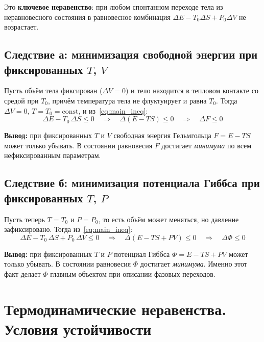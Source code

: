 \documentclass[../general/general]{subfiles}
\begin{document}
Это \textbf{ключевое неравенство}: при любом спонтанном переходе тела из неравновесного состояния в равновесное комбинация $\Delta E - T_0\Delta S + P_0\Delta V$ не возрастает.

\subsection{Следствие а: минимизация свободной энергии при фиксированных $T$, $V$}

Пусть объём тела фиксирован ($\Delta V = 0$) и тело находится в тепловом контакте со средой при $T_0$, причём температура тела не флуктуирует и равна $T_0$. Тогда $\Delta V = 0$, $T = T_0 = \text{const}$, и из~\eqref{eq:main_ineq}:
\begin{equation}
    \Delta E - T_0\,\Delta S \leq 0 \quad \Rightarrow \quad \Delta(E - TS) \leq 0 \quad \Rightarrow \quad \Delta F \leq 0
\end{equation}

\textbf{Вывод:} при фиксированных $T$ и $V$ свободная энергия Гельмгольца $F = E - TS$ может только убывать. В состоянии равновесия $F$ достигает \emph{минимума} по всем нефиксированным параметрам.

\subsection{Следствие б: минимизация потенциала Гиббса при фиксированных $T$, $P$}

Пусть теперь $T = T_0$ и $P = P_0$, то есть объём может меняться, но давление зафиксировано. Тогда из~\eqref{eq:main_ineq}:
\begin{equation}
    \Delta E - T_0\,\Delta S + P_0\,\Delta V \leq 0 \quad \Rightarrow \quad \Delta(E - TS + PV) \leq 0 \quad \Rightarrow \quad \Delta\Phi \leq 0
\end{equation}

\textbf{Вывод:} при фиксированных $T$ и $P$ потенциал Гиббса $\Phi = E - TS + PV$ может только убывать. В состоянии равновесия $\Phi$ достигает \emph{минимума}. Именно этот факт делает $\Phi$ главным объектом при описании фазовых переходов.



\section{Термодинамические неравенства. Условия устойчивости}
\end{document}
